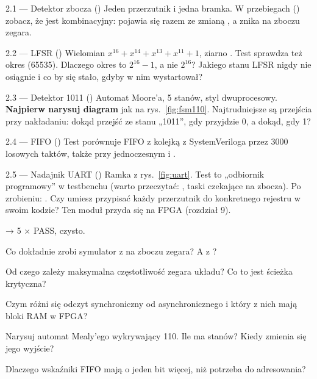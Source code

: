 \begin{zadanie}{2.1 --- Detektor zbocza ()}
Jeden przerzutnik i jedna bramka. W przebiegach ()
zobacz, że  jest kombinacyjny: pojawia się razem ze zmianą
, a znika na zboczu zegara.
\end{zadanie}

\begin{zadanie}{2.2 --- LFSR ()}
Wielomian $x^{16}+x^{14}+x^{13}+x^{11}+1$, ziarno . Test
sprawdza też okres (65535). Dlaczego okres to $2^{16}-1$, a nie $2^{16}$? Jakiego
stanu LFSR nigdy nie osiągnie i co by się stało, gdyby w nim wystartował?
\end{zadanie}

\begin{zadanie}{2.3 --- Detektor 1011 ()}
Automat Moore'a, 5 stanów, styl dwuprocesowy. \textbf{Najpierw narysuj
diagram} jak na rys.~\ref{fig:fsm110}. Najtrudniejsze są przejścia przy
nakładaniu: dokąd przejść ze stanu „1011”, gdy przyjdzie 0, a dokąd, gdy 1?
\end{zadanie}

\begin{zadanie}{2.4 --- FIFO ()}
Test porównuje FIFO z kolejką  z SystemVeriloga przez 3000 losowych
taktów, także przy jednoczesnym  i .
\end{zadanie}

\begin{zadanie}{2.5 --- Nadajnik UART ()}
Ramka z rys.~\ref{fig:uart}. Test to „odbiornik programowy” w testbenchu (warto
przeczytać: , taski czekające na zbocza). Po zrobieniu:
. Czy umiesz przypisać każdy przerzutnik do
konkretnego rejestru w swoim kodzie? Ten moduł przyda się na FPGA (rozdział 9).
\end{zadanie}

\begin{gotowe}
 → 5 × PASS,  czysto.
\end{gotowe}

\begin{kontrolne}
  \item Co dokładnie zrobi symulator z  na zboczu zegara? A z ?
  \item Od czego zależy maksymalna częstotliwość zegara układu? Co to jest ścieżka krytyczna?
  \item Czym różni się odczyt synchroniczny od asynchronicznego i który z nich mają bloki RAM w FPGA?
  \item Narysuj automat Mealy'ego wykrywający 110. Ile ma stanów? Kiedy zmienia się jego wyjście?
  \item Dlaczego wskaźniki FIFO mają o jeden bit więcej, niż potrzeba do adresowania?
\end{kontrolne}
